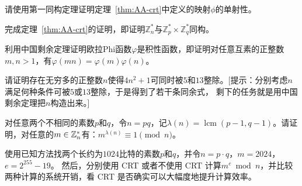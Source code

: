 \begin{problemset}
\item 请使用第一同构定理证明定理~\ref{thm:AA-crt}中定义的映射$\phi$的单射性。%

\item 完成定理~\ref{thm:AA-crt}的证明，即证明$\mathbb{Z}_n^*$与$\mathbb{Z}_p^* \times \mathbb{Z}_q^*$同构。

\item 利用中国剩余定理证明欧拉Phi函数$\varphi$是积性函数，即证明对任意互素的正整数$m,n > 1$，有$\varphi(mn) = \varphi(m) \varphi(n)$。

\item 请证明存在无穷多的正整数$n$使得$4n^2 + 1$可同时被$5$和$13$整除。[提示：分别考虑$n$满足何种条件可被$5$或$13$整除，于是得到了若干条同余式，
剩下的任务就是用中国剩余定理把$n$构造出来。] %

\item 对任意两个不相同的素数$p$和$q$，令$n = pq$，记$\lambda(n) =  \operatorname{lcm} (p-1, q-1)$。请证明，对任意的$m \in {\mathbb Z}_n^*$有：$m^{\lambda(n)} \equiv 1 \pmod{n}$。

\item 使用已知方法找两个长约为$1024$比特的素数$p$和$q$，并令$n = p \cdot q$，$m = 2024$，$e=2^{255} - 19$。
然后，分别使用 CRT 或者不使用 CRT 计算$m^e \bmod n$，并比较两种计算的系统开销，看 CRT 是否确实可以大幅度地提升计算效率。

\end{problemset}
